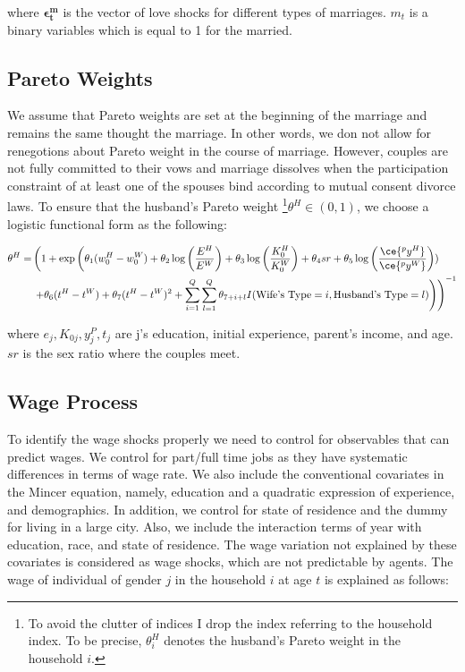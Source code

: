 where $\mathbf {\epsilon_t^m}$ is the vector of love shocks for different types of marriages. $m_t$ is a binary variables which is equal to 1 for the married. 

\subsection{Pareto Weights}

 We assume that Pareto weights are set at the beginning of the marriage and remains the same thought the marriage. In other words, we don not allow for renegotions about Pareto weight in the course of marriage. However, couples are not fully committed to their vows and marriage dissolves when the participation constraint of at least one of the spouses bind according to mutual consent divorce laws. To ensure that the husband's Pareto weight \footnote {To avoid the clutter of indices I drop the index referring to the household index. To be precise, $\theta_i^H$ denotes the husband's Pareto weight in the household $i$.}$\theta^H \in (0,1)$, we choose a logistic functional form as the following: 

\begin{align*}
\theta^H = & \left ( 1 + \exp \left( \theta_1 (w^H_{0} - w^W_{0}) + \theta_2 \log \left( \dfrac{E^H}{E^W} \right) + \theta_3 \log \left ( \dfrac{K^H_{0}}{K^W_{0}}\right ) + \theta_4 sr +\theta_5 \log \left ( \dfrac{\ce{^p y^H}}{\ce{^p y^W}}\right ) )\right. \right. \\
& \left. \left. + \theta_6 (t^H - t^W) + \theta_7 (t^H - t^W)^2 +  \sum \limits_{i=1}^{Q} \sum \limits_{l=1}^{Q} \theta_{7+i+l} I(\text{Wife's Type} = i, \text{Husband's Type} = l)   \right )\right )^{-1}
\end{align*}

where \( e_j, K_{0j}, y_j^P, t_j\) are j's education, initial experience, parent's income, and age. $sr$ is the sex ratio where the couples meet. \\

\subsection{Wage Process}

To identify the wage shocks properly we need to control for observables that can predict wages. We control for part/full time jobs as they have systematic differences in terms of wage rate. We also include the conventional covariates in the Mincer equation, namely, education and a quadratic expression of experience, and demographics. In addition, we control for state of residence and the dummy for living in a large city. Also, we include the interaction terms of year with education, race, and state of residence.  
 The wage variation not explained by these covariates is considered as wage shocks, which are not predictable by agents. The wage of individual of gender $j$ in the household $i$ at age $t$ is explained as follows: 

